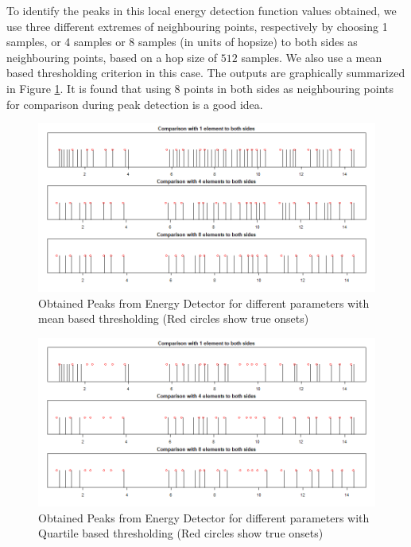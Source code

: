 \documentclass[10pt]{article}
\begin{document}
To identify the peaks in this local energy detection function values obtained, we use three different extremes of neighbouring points, respectively by choosing 1 samples, or 4 samples or 8 samples (in units of hopsize) to both sides as neighbouring points, based on a hop size of $512$ samples. We also use a mean based thresholding criterion in this case. The outputs are graphically summarized in Figure \ref{fig:energy_onsets_song1}. It is found that using 8 points in both sides as neighbouring points for comparison during peak detection is a good idea.

\begin{figure}
    \centering
    \includegraphics[width = \textwidth]{energy_onsets_song1.png}
    \caption{Obtained Peaks from Energy Detector for different parameters with mean based thresholding (Red circles show true onsets)}
    \label{fig:energy_onsets_song1}
\end{figure}

\begin{figure}
    \centering
    \includegraphics[width = \textwidth]{energy_onsets_song1_type2.png}
    \caption{Obtained Peaks from Energy Detector for different parameters with Quartile based thresholding (Red circles show true onsets)}
    \label{fig:energy_onsets_song1_type2}
\end{figure}
\end{document}
